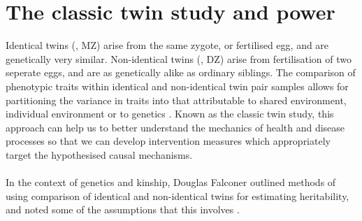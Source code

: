 \section{The classic twin study and power}
Identical twins (\mz, MZ) arise from the same zygote, or fertilised egg, and are genetically very similar.  Non-identical twins (\dz, DZ) arise from fertilisation of two seperate eggs, and are as genetically alike as ordinary siblings.  The comparison of phenotypic traits within identical and non-identical twin pair samples allows for partitioning the variance in traits into that attributable to  shared environment, individual environment or to genetics  \cite{Teare2011}.  Known as the classic twin study, this approach can help us to better understand the mechanics of health and disease processes so that we can develop intervention measures which appropriately target the hypothesised causal mechanisms.
\\
\\
\cite{Visscher2008b}
In the context of genetics and kinship, Douglas Falconer outlined methods of using comparison of identical and non-identical twins for estimating heritability, and noted some of the assumptions that this involves \cite{Falconer1960}.

